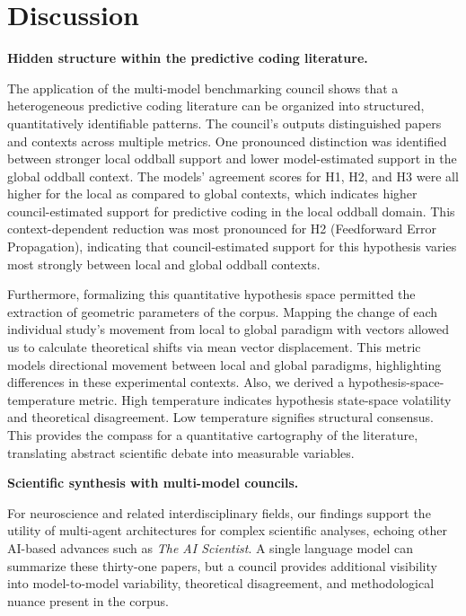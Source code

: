 \documentclass[12pt]{article}
\begin{document}
\section{Discussion}\label{discussion}

\noindent\textbf{Hidden structure within the predictive coding literature.}

The application of the multi-model benchmarking council shows that a heterogeneous predictive coding literature can be organized into structured, quantitatively identifiable patterns. The council's outputs distinguished papers and contexts across multiple metrics. One pronounced distinction was identified between stronger local oddball support and lower model-estimated support in the global oddball context. The models' agreement scores for H1, H2, and H3 were all higher for the local as compared to global contexts, which indicates higher council-estimated support for predictive coding in the local oddball domain. This context-dependent reduction was most pronounced for H2 (Feedforward Error Propagation), indicating that council-estimated support for this hypothesis varies most strongly between local and global oddball contexts.

Furthermore, formalizing this quantitative hypothesis space permitted the extraction of geometric parameters of the corpus. Mapping the change of each individual study's movement from local to global paradigm with vectors allowed us to calculate theoretical shifts via mean vector displacement. This metric models directional movement between local and global paradigms, highlighting differences in these experimental contexts. Also, we derived a hypothesis-space-temperature metric. High temperature indicates hypothesis state-space volatility and theoretical disagreement. Low temperature signifies structural consensus. This provides the compass for a quantitative cartography of the literature, translating abstract scientific debate into measurable variables.

\noindent\textbf{Scientific synthesis with multi-model councils.}

For neuroscience and related interdisciplinary fields, our findings support the utility of multi-agent architectures for complex scientific analyses, echoing other AI-based advances such as \emph{The AI Scientist}\cite{ref45}. A single language model can summarize these thirty-one papers, but a council provides additional visibility into model-to-model variability, theoretical disagreement, and methodological nuance present in the corpus.
\end{document}
